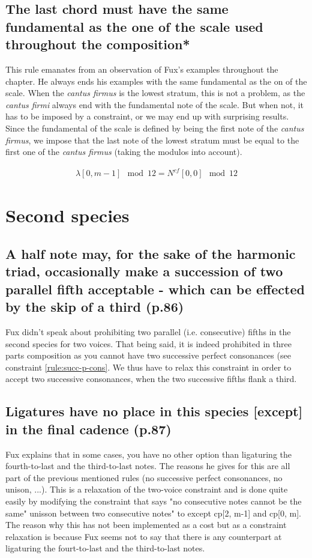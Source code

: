 \subsection{\reddot The last chord must have the same fundamental as the one of the scale used throughout the composition*}
This rule emanates from an observation of Fux's examples throughout the chapter. He always ends his examples with the same fundamental as the on of the scale.
When the \textit{cantus firmus} is the lowest stratum, this is not a problem, as the \textit{cantus firmi} always end with the fundamental note of the scale. But when not, it has to be imposed by a constraint, or we may end up with surprising results. Since the fundamental of the scale is defined by being the first note of the \textit{cantus firmus}, we impose that the last note of the lowest stratum must be equal to the first one of the \textit{cantus firmus} (taking the modulos into account).


\begin{equation} \begin{aligned}
\lambda[0, m-1] \mod 12 = N^{cf}[0, 0] \mod 12
\end{aligned} \end{equation}



\section{Second species}
\subsection{A half note may, for the sake of the harmonic triad, occasionally make a succession of two parallel fifth acceptable - which can be effected by the skip of a third (p.86)}
Fux didn't speak about prohibiting two parallel (i.e. consecutive) fifths in the second species for two voices. That being said, it is indeed prohibited in three parts composition as you cannot have two successive perfect consonances (see constraint \ref{rule:succ-p-cons}. We thus have to relax this constraint in order to accept two successive consonances, when the two successive fifths flank a third.


\subsection{Ligatures have no place in this species [except] in the final cadence (p.87)}
Fux explains that in some cases, you have no other option than ligaturing the fourth-to-last and the third-to-last notes. The reasons he gives for this are all part of the previous mentioned rules (no successive perfect consonances, no unison, ...).
This is a relaxation of the two-voice constraint and is done quite easily by modifying the constraint that says "no consecutive notes cannot be the same" unisson between two consecutive notes" to except cp[2, m-1] and cp[0, m]. The reason why this has not been implemented as a cost but as a constraint relaxation is because Fux seems not to say that there is any counterpart at ligaturing the fourt-to-last and the third-to-last notes.

